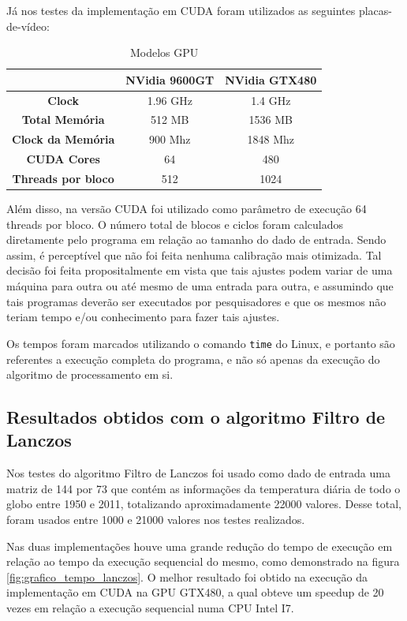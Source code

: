 Já nos testes da implementação em CUDA foram utilizados as seguintes placas-de-vídeo:

\begin{table}[H]
\caption{Modelos GPU}
\begin{center}
\begin{tabular}{ccc}
 & \textbf{NVidia 9600GT} & \textbf{NVidia GTX480}\\
\hline\hline
\textbf{Clock}				& 1.96 GHz	& 1.4 GHz \\
\textbf{Total Memória}		& 512 MB		& 1536 MB \\
\textbf{Clock da Memória}	& 900 Mhz	& 1848 Mhz \\
\textbf{CUDA Cores}			& 64			& 480 \\
\textbf{Threads por bloco}	& 512		& 1024
\end{tabular} 
\end{center}
\end{table}

Além disso, na versão CUDA foi utilizado como parâmetro de execução 64 threads por bloco. O número total de blocos e ciclos foram calculados diretamente pelo programa em relação ao tamanho do dado de entrada. Sendo assim, é perceptível que não foi feita nenhuma calibração mais otimizada. Tal decisão foi feita propositalmente em vista que tais ajustes podem variar de uma máquina para outra ou até mesmo de uma entrada para outra, e assumindo que tais programas deverão ser executados por pesquisadores e que os mesmos não teriam tempo e/ou conhecimento para fazer tais ajustes.

Os tempos foram marcados utilizando o comando \texttt{time} do Linux, e portanto são referentes a execução completa do programa, e não só apenas da execução do algoritmo de processamento em si.

\subsection{Resultados obtidos com o algoritmo Filtro de Lanczos}

Nos testes do algoritmo Filtro de Lanczos foi usado como dado de entrada uma matriz de 144 por 73 que contém as informações da temperatura diária de todo o globo entre 1950 e 2011, totalizando aproximadamente 22000 valores. Desse total, foram usados entre 1000 e 21000 valores nos testes realizados.

Nas duas implementações houve uma grande redução do tempo de execução em relação ao tempo da execução sequencial do mesmo, como demonstrado na figura \ref{fig:grafico_tempo_lanczos}. O melhor resultado foi obtido na execução da implementação em CUDA na GPU GTX480, a qual obteve um speedup de 20 vezes em relação a execução sequencial numa CPU Intel I7.

